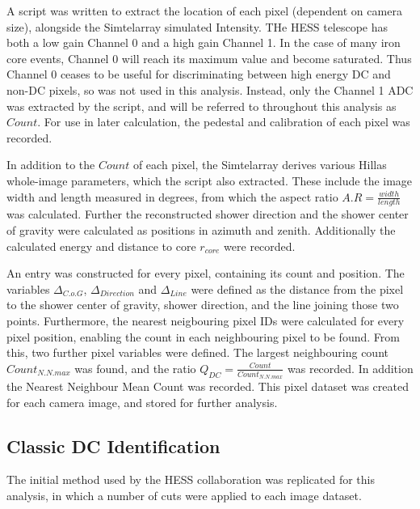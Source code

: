 \documentclass{article}
\begin{document}
A script was written to extract the location of each pixel (dependent on camera size), alongside the Sim\textunderscore telarray simulated Intensity. THe HESS telescope has both a low gain Channel 0 and a high gain Channel 1. In the case of many iron core events, Channel 0 will reach its maximum value and become saturated. Thus Channel 0 ceases to be useful for discriminating between high energy DC and non-DC pixels, so was not used in this analysis. Instead, only the Channel 1 ADC was extracted by the script, and will be referred to throughout this analysis as $Count$. For use in later calculation, the pedestal and calibration of each pixel was recorded.

In addition to the $Count$ of each pixel, the Sim\textunderscore telarray derives various Hillas whole-image parameters, which the script also extracted. These include the image width and length measured in degrees, from which the aspect ratio $A.R = \frac{width}{length}$ was calculated. Further the reconstructed shower direction and the shower center of gravity were calculated as positions in azimuth and zenith. Additionally the calculated energy and distance to core $r_{core}$ were recorded.

An entry was constructed for every pixel, containing its count and position. The variables $ \Delta_{C.o.G}$, $\Delta_{Direction}$ and $\Delta_{Line}$ were defined as the distance from the pixel to the shower center of gravity, shower direction, and the line joining those two points. Furthermore, the nearest neigbouring pixel IDs were calculated for every pixel position, enabling the count in each neighbouring pixel to be found. From this, two further pixel variables were defined. The largest neighbouring count $Count_{N.N.max}$ was found, and the ratio $ Q_{DC} = \frac{Count}{Count_{N.N.max}} $ was recorded. In addition the Nearest Neighbour Mean Count was recorded. This pixel dataset was created for each camera image, and stored for further analysis.

\subsection{Classic DC Identification}
The initial method used by the HESS collaboration \cite{hess07} was replicated for this analysis, in which a number of cuts were applied to each image dataset.
\end{document}
